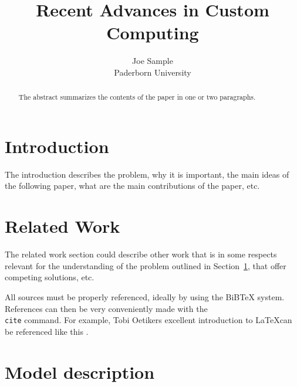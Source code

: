 \documentclass[12pt,twoside]{article}
\newcommand{\participant}{Joe Sample}
\newcommand{\affiliation}{Paderborn University}
\newcommand{\topic}{Recent Advances in Custom Computing}
\begin{document}
\title{\topic}
\author{\Large{\participant}\\ \affiliation \\ {\small \emailaddress}}
\date{}
\maketitle
\thispagestyle{empty}


\begin{abstract}
  The abstract summarizes the contents of the paper in one or two paragraphs.
\end{abstract}


\section{Introduction}
\label{sec:introduction}

The introduction describes the problem, why it is important, the main
ideas of the following paper, what are the main contributions of the
paper, etc.

\section{Related Work}
\label{sec:relwork}

The related work section could describe other work that is in some
respects relevant for the understanding of the problem outlined in
Section~\ref{sec:introduction}, that offer competing solutions, etc.

All sources must be properly referenced, ideally by using the BiBTeX
system. References can then be very conveniently made with the
\texttt{\\cite} command. For example, Tobi Oetikers excellent introduction
to \LaTeX can be referenced like this \cite{lshort}.

\section{Model description}
\label{sec:model}
\end{document}
